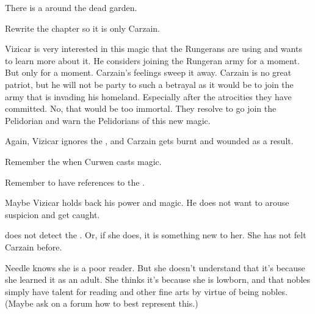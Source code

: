 \begin{garbage}
\begin{changes}
    There is a  around the dead garden. 
  
  \begin{comment}
  \paragraph{The Emperor Inviolate}
  \end{comment}
    Rewrite the chapter so it is only Carzain.
    
    Vizicar is very interested in this magic that the Rungerans are using and wants to learn more about it. 
    He considers joining the Rungeran army for a moment. 
    But only for a moment. 
    Carzain's feelings sweep it away. 
    Carzain is no great patriot, but he will not be party to such a betrayal as it would be to join the army that is invading his homeland. 
    Especially after the atrocities they have committed.
    No, that would be too immortal.
    They resolve to go join the Pelidorian \ishrah{} and warn the Pelidorians of this new magic. 
    
    Again, Vizicar ignores the , and Carzain gets burnt and wounded as a result. 
    
    Remember the  when Curwen casts magic. 
    
    Remember to have references to the \hs{\shechinah}. 
    
    Maybe Vizicar holds back his power and magic. 
    He does not want to arouse suspicion and get caught. 
    
    \Takestsha{} does not detect the \vertex. 
    Or, if she does, it is something new to her. 
    She has not felt Carzain before. 
  
  \begin{comment}
  \paragraph{The Thirsty Nether}
  \end{comment}
    Needle knows she is a poor reader. 
    But she doesn't understand that it's because she learned it as an adult. 
    She thinks it's because she is lowborn, and that nobles simply have talent for reading and other fine arts by virtue of being nobles. 
    (Maybe ask on a forum how to best represent this.)
  
  
  \begin{comment}

\end{comment}
\end{changes}
\end{garbage}
